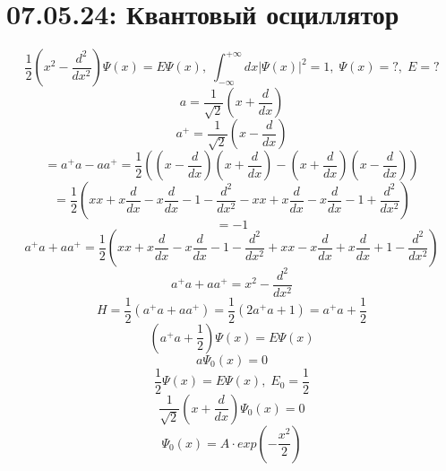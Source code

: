 \documentclass[1 pt]{article}
\begin{document}
\section{07.05.24: Квантовый осциллятор}
\begin{equation}
    \frac{1}{2}(x^2-\frac{d^2}{dx^2}) \Psi(x) = E \Psi(x), \; \int_{- \infty}^{+ \infty} dx |\Psi(x)|^2 = 1, \; \Psi(x) = ?, \; E = ?
\end{equation}
\begin{equation*}
    a = \frac{1}{\sqrt{2}}(x+\frac{d}{dx})
\end{equation*}
\begin{equation*}
    a^+ = \frac{1}{\sqrt{2}}(x-\frac{d}{dx})
\end{equation*}
\begin{equation*}
    [a^+, a] = a^+ a - aa^+ = \frac{1}{2}((x-\frac{d}{dx})(x+\frac{d}{dx})-(x+\frac{d}{dx})(x-\frac{d}{dx}))
\end{equation*}
\begin{equation*}
    [a^+, a] = \frac{1}{2}(xx+x\frac{d}{dx}-x\frac{d}{dx}-1-\frac{d^2}{dx^2}-xx+x\frac{d}{dx}-x\frac{d}{dx}-1+\frac{d^2}{dx^2})
\end{equation*}
\begin{equation*}
    [a^+, a] = -1
\end{equation*}
\begin{equation*}
    a^+a+aa^+ = \frac{1}{2}(xx+x\frac{d}{dx}-x\frac{d}{dx}-1-\frac{d^2}{dx^2}+xx-x\frac{d}{dx}+x\frac{d}{dx}+1-\frac{d^2}{dx^2})
\end{equation*}
\begin{equation*}
    a^+a+aa^+ = x^2 - \frac{d^2}{dx^2}
\end{equation*}
\begin{equation*}
    H = \frac{1}{2}(a^+a+aa^+) = \frac{1}{2}(2a^+a+1) = a^+a+\frac{1}{2}
\end{equation*}
\begin{equation*}
    (a^+a+\frac{1}{2}) \Psi(x) = E \Psi(x)
\end{equation*}
\begin{equation*}
    a \Psi_0(x) = 0
\end{equation*}
\begin{equation}
    \frac{1}{2} \Psi(x) = E \Psi(x), \; E_0 = \frac{1}{2}
\end{equation}
\begin{equation*}
    \frac{1}{\sqrt{2}}(x+\frac{d}{dx}) \Psi_0(x) = 0
\end{equation*}
\begin{equation}
    \Psi_0(x) = A \cdot exp(-\frac{x^2}{2})
\end{equation}
\end{document}

